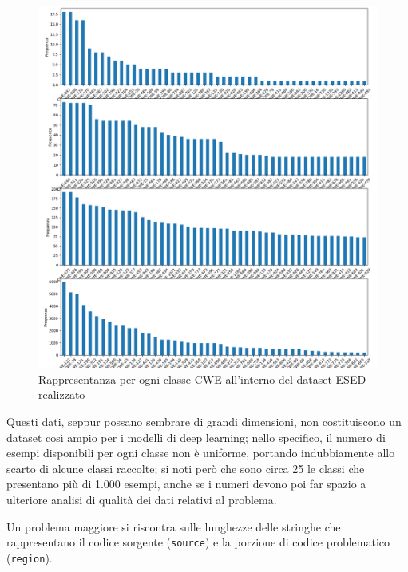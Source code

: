 \documentclass[conference]{IEEEtran}
\begin{document}
\begin{figure}[h]
    \centering
    \includegraphics[width=\columnwidth]{images/ESED/SARD_GENERATE_label_distribution.png}
    \caption{Rappresentanza per ogni classe CWE all'interno del dataset ESED realizzato}
    \label{fig:class-on-esed}
\end{figure}

Questi dati, seppur possano sembrare di grandi dimensioni, non costituiscono un dataset così ampio per i modelli di deep learning; nello specifico, il numero di esempi disponibili per ogni classe non è uniforme, portando indubbiamente allo scarto di alcune classi raccolte; si noti però che sono circa 25 le classi che presentano più di 1.000 esempi, anche se i numeri devono poi far spazio a ulteriore analisi di qualità dei dati relativi al problema.


Un problema maggiore si riscontra sulle lunghezze delle stringhe che rappresentano il codice sorgente (\texttt{source}) e la porzione di codice problematico (\texttt{region}). 
\end{document}
